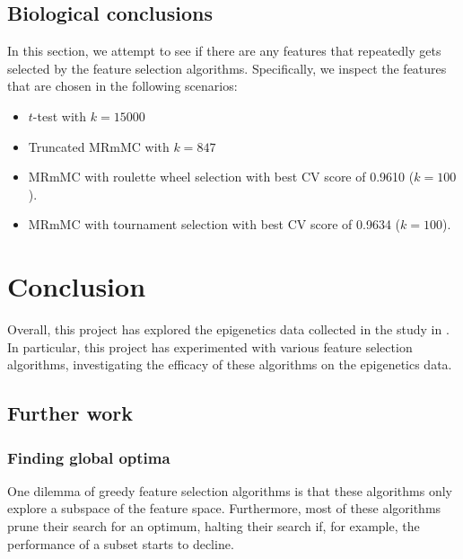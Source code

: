 \documentclass[12pt, twoside, a4paper]{report}
\begin{document}
\section{Biological conclusions}

In this section, we attempt to see if there are any features that repeatedly gets selected by the feature selection algorithms. Specifically, we inspect the features that are chosen in the following scenarios:
\begin{itemize}
  \item $t$-test with $k=15000$
  \item Truncated MRmMC with $k=847$
  \item MRmMC with roulette wheel selection with best CV score of 0.9610 ($k=100$).
  \item MRmMC with tournament selection with best CV score of 0.9634 ($k=100$).
\end{itemize}



\chapter{Conclusion}

Overall, this project has explored the epigenetics data collected in the study in \cite{RefWorks:78}. In particular, this project has experimented with various feature selection algorithms, investigating the efficacy of these algorithms on the epigenetics data.

\section{Further work} \label{further_work}

\subsection{Finding global optima}

One dilemma of greedy feature selection algorithms is that these algorithms only explore a subspace of the feature space. Furthermore, most of these algorithms prune their search for an optimum, halting their search if, for example, the performance of a subset starts to decline.
\end{document}
